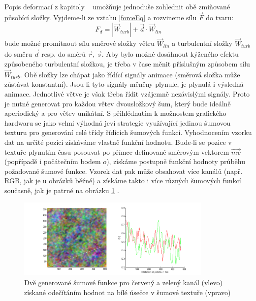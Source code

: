 Popis deformací z kapitoly ~  umožňuje jednoduše zohlednit obě zmiňované působící složky.
Vyjdeme-li ze vztahu \eqref{forceEq} a rozvineme sílu $\vec{F}$ do tvaru:
\begin{equation}
\label{windEq}
F_{d} = \left | \vec{W}_{turb} \right | + \vec{d}\cdot \vec{W}_{lin}
\end{equation}
bude možné promítnout sílu směrové složky větru $\vec{W}_{lin}$ a turbulentní složky $\vec{W}_{turb}$ do směru $\vec{d}$ resp. do směrů $\vec{r}$, $\vec{s}$. Aby bylo možné dosáhnout kýženého efektu způsobeného turbulentní složkou, je třeba v čase měnit příslušným způsobem sílu $\vec{W}_{turb}$. Obě složky lze chápat jako řídící signály animace (směrová složka může zůstávat konstantní). Jsou-li tyto signály měněny plynule, je plynulá i výsledná animace.
Jednotlivé větve je však třeba řídit vzájemně nezávislými signály. Proto je nutné generovat pro každou větev dvousložkový šum, který bude ideálně aperiodický a pro větev unikátní. S přihlédnutím k možnostem grafického hardwaru se jako velmi výhodná jeví strategie využívající jedinou šumovou texturu pro generování celé třídy řídících šumových funkcí. Vyhodnocením vzorku dat na určité pozici získáváme vlastně funkční hodnotu. Bude-li se pozice v textuře plynutím času posouvat po přímce definované směrovým vektorem $\vec{mv}$ (popřípadě i počátečním bodem $o$), získáme postupně funkční hodnoty průběhu požadované šumové funkce. Vzorek dat pak může obsahovat více kanálů (např. RGB, jak je u obrázků běžné) a získáme takto i více různých šumových funkcí současně, jak je patrné na obrázku \ref{fig:noiseFunctions} .
 \begin{figure}[here]
\begin{center}
\includegraphics[width=0.85\textwidth]{./figures/noiseCut1.png}
\end{center}
\caption{ Dvě generované šumové funkce pro červený a zelený kanál (vlevo) získané odečítáním hodnot na bílé úsečce v šumové textuře (vpravo)
}
\label{fig:noiseFunctions}
\end{figure}

